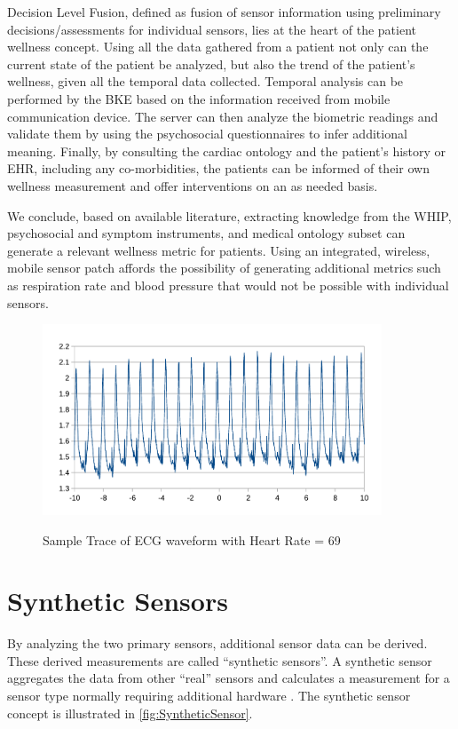 Decision Level Fusion, defined as fusion of sensor information using preliminary decisions/assessments for individual sensors, lies at the heart of the patient wellness concept. Using all the data gathered from a patient not only can the current state of the patient be analyzed, but also the trend of the patient's wellness, given all the temporal data collected. Temporal analysis can be performed by the BKE based on the information received from mobile communication device. The server can then analyze the biometric readings and validate them by using the psychosocial questionnaires to infer additional meaning. Finally, by consulting the cardiac ontology and the patient's history or EHR, including any co-morbidities, the patients can be informed of their own wellness measurement and offer interventions on an as needed basis. 

We conclude, based on available literature, extracting knowledge from the WHIP, psychosocial and symptom instruments, and medical ontology subset can generate a relevant wellness metric for patients. Using an integrated, wireless, mobile sensor patch affords the possibility of generating additional metrics such as respiration rate and blood pressure that would not be possible with individual sensors.

\begin{figure}
	\begin{center}
		\label{fig:HR69}
		\includegraphics[scale=1,width=0.9\textwidth]{Images/HR69.pdf} 
		\caption{Sample Trace of ECG waveform with Heart Rate = 69}
	\end{center}
\end{figure}

\section{Synthetic Sensors}
\label{sec:SyntheticSensors}
By analyzing the two primary sensors, additional sensor data can be derived.  These derived measurements are called “synthetic sensors”. A synthetic sensor aggregates the data from other “real” sensors and calculates a measurement for a sensor type normally requiring additional hardware \cite{Fortier2009}. The synthetic sensor concept is illustrated in \cref{fig:SyntheticSensor}.

